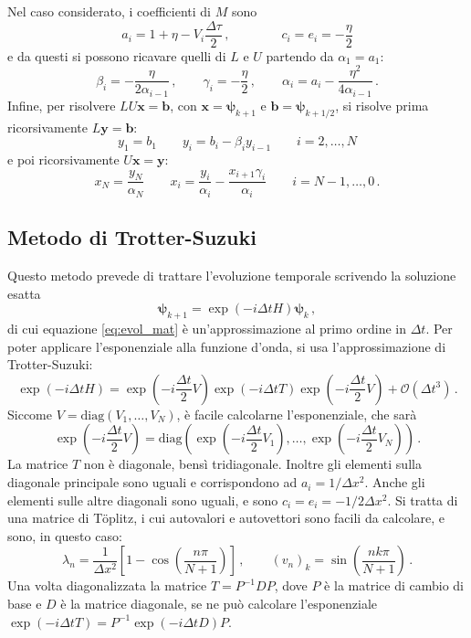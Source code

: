 \documentclass[a4paper, titlepage]{article}
\numberwithin{equation}{section}
\begin{document}
Nel caso considerato, i coefficienti di $M$ sono
\begin{equation*}
    a_i = 1 + \eta - V_i \frac{\Delta\tau}{2}\, , \qquad\qquad
    c_i = e_i = -\frac{\eta}{2}
\end{equation*}
e da questi si possono ricavare quelli di $L$ e $U$ partendo da $\alpha_1 = a_1$:
\begin{equation}
    \beta_i = -\frac{\eta}{2\alpha_{i-1}}\, ,
    \qquad
    \gamma_i = -\frac{\eta}{2}\, ,
    \qquad
    \alpha_i = a_i - \frac{\eta^2}{4\alpha_{i-1}}\, .
    \label{eq:recZ}
\end{equation}
Infine, per risolvere $LU\mathbf{x} = \mathbf{b}$, con $\mathbf{x} = \bm{\psi}_{k+1}$ e $\mathbf{b} = \bm{\psi}_{k+1/2}$, si risolve prima ricorsivamente $L\mathbf{y} = \mathbf{b}$:
\begin{equation}
    y_1 = b_1 \qquad y_i = b_i -\beta_i y_{i-1} \qquad i = 2,\dots,N
    \label{eq:recA}
\end{equation}
e poi ricorsivamente $U\mathbf{x} = \mathbf{y}$:
\begin{equation}
    x_N = \frac{y_N}{\alpha_N} \qquad x_i = \frac{y_i}{\alpha_i} - \frac{x_{i+1}\gamma_i}{\alpha_i} \qquad i = N-1,\dots,0\, .
    \label{eq:recB}
\end{equation}

\subsection{Metodo di Trotter-Suzuki}
Questo metodo prevede di trattare l'evoluzione temporale scrivendo la soluzione esatta
\begin{equation*}
    \bm{\psi}_{k+1} = \exp(-i\Delta t H)\bm{\psi}_k\, ,
\end{equation*}
di cui equazione \eqref{eq:evol_mat} è un'approssimazione al primo ordine in $\Delta t$. Per poter applicare l'esponenziale alla funzione d'onda, si usa l'approssimazione di Trotter-Suzuki:
\begin{equation*}
    \exp(-i \Delta t H) = \exp\left(-i \frac{\Delta t}{2} V\right) \exp(-i \Delta t T) \exp\left(-i \frac{\Delta t}{2} V\right) + \mathcal{O}(\Delta t^3)\, .
\end{equation*}
Siccome $V = \text{diag}(V_1,\dots,V_N)$, è facile calcolarne l'esponenziale, che sarà
\[
    \exp(-i\frac{\Delta t}{2} V) = \text{diag}\left(\exp(-i\frac{\Delta t}{2} V_1),\dots,\exp(-i\frac{\Delta t}{2} V_N)\right)\, .
\]
La matrice $T$ non è diagonale, bensì tridiagonale. Inoltre gli elementi sulla diagonale principale sono uguali e corrispondono ad $a_i = 1/\Delta x^2$. Anche gli elementi sulle altre diagonali sono uguali, e sono $c_i = e_i = -1/2\Delta x^2$. Si tratta di una matrice di Töplitz, i cui autovalori e autovettori sono facili da calcolare, e sono, in questo caso:
\[
    \lambda_n = \frac{1}{\Delta x^2} \left[1 -\cos\left(\frac{n\pi}{N+1}\right)\right]\, ,
    \qquad
    (v_n)_k = \sin\left(\frac{nk\pi}{N+1}\right)\, .
\]
Una volta diagonalizzata la matrice $T = P^{-1}DP$, dove $P$ è la matrice di cambio di base e $D$ è la matrice diagonale, se ne può calcolare l'esponenziale $\exp(-i\Delta t T) = P^{-1}\exp(-i\Delta t D)P$.
\end{document}
